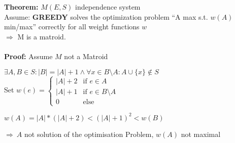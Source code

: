 \textbf{Theorem: } $M(E, S)$ independence system\\
Assume: \textbf{GREEDY} solves the optimization problem ``A max s.t. $w(A)$ min/max'' correctly for all weight functions $w$\\
$\Rightarrow$ M is a matroid.\\\\
\textbf{Proof: } Assume $M$ not a Matroid
\begin{compactenum}
	\item{
	$\exists A, B \in S: |B| = |A| + 1 \land \forall x \in B \setminus A: A\cup \{x\} \notin S$\\
	Set $w(e) = \begin{cases} 	|A| + 2 & \text{if } e\in A\\
								|A| + 1 & \text{if } e \in B\setminus A\\
								0 & \text{else}
				\end{cases} $
	}
	\item{
	$w(A) = |A| * (|A| + 2) < (|A| + 1)^2 < w(B)$
	}
	\item{
	$\Rightarrow~A$ not solution of the optimisation Problem, $w(A)$ not maximal
	}
\end{compactenum}
